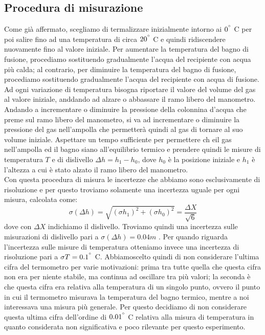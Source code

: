 \subsection{Procedura di misurazione}
Come già affermato, scegliamo di termalizzare inizialmente intorno ai $0^{\degree}$ C per poi salire fino ad una temperatura di circa $20^{\degree}$ C e quindi ridiscendere nuovamente fino al valore iniziale.
Per aumentare la temperatura del bagno di fusione, procediamo sostituendo gradualmente l'acqua del recipiente con acqua più calda; al contrario, per diminuire la temperatura del bagno di fusione, procediamo sostituendo gradualmente l'acqua del recipiente con acqua di fusione.
Ad ogni variazione di temperatura bisogna riportare il valore del volume del gas al valore iniziale, anddando ad alzare o abbassare il ramo libero del manometro.
Andando a incrementare o diminuire la pressione della colonnina d'acqua che preme sul ramo libero del manometro, si va ad incrementare o diminuire la pressione del gas nell'ampolla che permetterà quindi al gas di tornare al suo volume iniziale.
Aspettare un tempo sufficiente per permettere ch eil gas nell'ampolla ed il bagno siano all'equilibrio termico e prendere quindi le misure di temperatura $T$ e di dislivello $\Delta h = h_1 - h_0$, dove $h_0$ è la posizione iniziale e $h_1$ è l'altezza a cui è stato alzato il ramo libero del manometro.
\\
Con questa procedura di misura le incertezze che abbiamo sono esclusivamente di risoluzione e per questo troviamo solamente una incertezza uguale per ogni misura, calcolata come:
\begin{equation}
\sigma (\Delta h) = \sqrt{(\sigma h_1)^2 + (\sigma h_0)^2} = \frac{\Delta X}{\sqrt{6}}
\end{equation}
dove con $\Delta X$ indichiamo il dislivello.
Troviamo quindi una incertezza sulle misurazioni di dislivello pari a $\sigma (\Delta h) = 0.04 m$ .
Per quando riguarda l'incertezza sulle misure di temperatura otteniamo invece una incertezza di risoluzione pari a $\sigma T = 0.1^{\degree}$ C.
Abbiamoscelto quindi di non considerare l'ultima cifra del termometro per varie motivazioni: prima tra tutte quella che questa cifra non era per niente stabile, ma continua ad oscillare tra più valori; la seconda è che questa cifra era relativa alla temperatura di un singolo punto, ovvero il punto in cui il termometro misurava la temperatura del bagno termico, mentre a noi interessava una misura più generale.
Per questo decidiamo di non considerare questa ultima cifra dell'ordine di $0.01^{\degree}$ C relativa alla misura di temperatura in quanto considerata non significativa e poco rilevante per questo esperimento.

